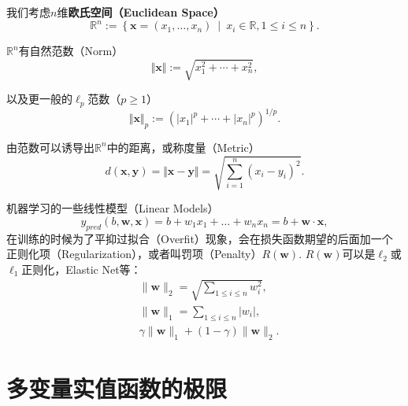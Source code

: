 \begin{frame}

我们考虑$n$维{\bfseries 欧氏空间（Euclidean Space）}
$$\mathbb{R}^n := \left\{ \mathbf{x} = (x_1,\ldots,x_n) \ \middle\vert \ x_i\in\mathbb{R}, 1\leqslant i \leqslant n \right\}.$$

\pause



$\mathbb{R}^n$有自然范数（Norm）
$$\Vert \mathbf{x} \Vert := \sqrt{x_1^2 + \cdots + x_n^2},$$

\pause

以及更一般的$\ell_p$范数（$p\geqslant1$）
$$\Vert \mathbf{x} \Vert_p := \left(|x_1|^p + \cdots + |x_n|^p\right)^{1/p}.$$

\pause

由范数可以诱导出$\mathbb{R}^n$中的距离，或称度量（Metric）
$$d(\mathbf{x}, \mathbf{y}) = \Vert \mathbf{x} - \mathbf{y} \Vert = \sqrt{\sum\limits_{i=1}^n (x_i-y_i)^2}.$$

\end{frame}


\begin{frame}

机器学习的一些线性模型（Linear Models）
$$\label{linear model}
y_{pred}(b,\mathbf{w},\mathbf{x}) = b + w_1x_1 + \ldots + w_nx_n = b + \mathbf{w}\cdot\mathbf{x},$$
在训练的时候为了平抑过拟合（Overfit）现象，会在损失函数期望的后面加一个正则化项（Regularization），或者叫罚项（Penalty）$R(\mathbf{w})$. $R(\mathbf{w})$可以是$\ell_2$或$\ell_1$正则化，Elastic Net等：
\begin{align*}
& \lVert\mathbf{w}\rVert_2 = \sqrt{\sum\limits_{1 \leqslant i \leqslant n} w_i^2}, \\
& \lVert\mathbf{w}\rVert_1 = \sum\limits_{1 \leqslant i \leqslant n} \lvert w_i\rvert, \\
& \gamma \lVert\mathbf{w}\rVert_1 + (1-\gamma) \lVert\mathbf{w}\rVert_2.
\end{align*}

\end{frame}


\section{多变量实值函数的极限}

